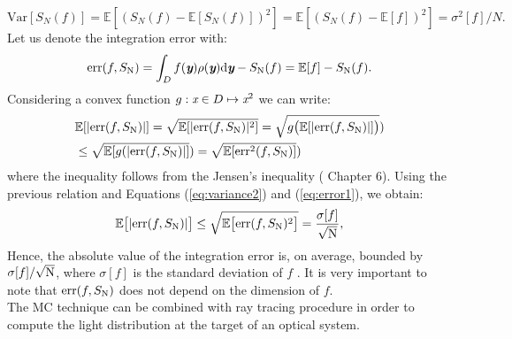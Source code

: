 \begin{equation}\label{eq:variance2}
\textrm{Var}[S_N(f)] = \mathbb{E}[(S_{N}(f)-\mathbb{E}[S_{N}(f)])^2]= \mathbb{E}[(S_{N}(f)-\mathbb{E}[f])^2] = \sigma^2[f]/N.
\end{equation}
Let us denote the integration error with:
\begin{equation}\label{eq:error1}
\textrm{err}(f, S_{\textrm{N}}) =\int_{D}f(\textit{\textbf{y}})\rho(\textit{\textbf{y}}) \textrm{d}\textit{\textbf{y}}-S_{\textrm{N}}(f) = \mathbb{E}[f]-S_{\textrm{N}}(f).
\end{equation}
Considering a convex function $g:\textit{x}\in D\mapsto\textit{x}^2$ we can write:
\begin{equation}
\begin{aligned}
&\mathbb{E}[|\textrm{err}(f, S_{\textrm{N}})|] = \sqrt{\mathbb{E}[|\textrm{err}(f, S_{\textrm{N}})|^2]} = \sqrt{g\big(\mathbb{E}[|\textrm{err}(f, S_{\textrm{N}})|]\big)}) \\&\leq\sqrt{\mathbb{E}[g(|\textrm{err}(f, S_{\textrm{N}})|]}) = \sqrt{\mathbb{E}[\textrm{err}^2(f, S_{\textrm{N}})]})
\end{aligned}
\end{equation} 
where the inequality follows from the Jensen's inequality (\cite{williams1991probability} Chapter $6$).
Using the previous relation and Equations (\ref{eq:variance2}) and (\ref{eq:error1}), we obtain:
\begin{equation}\label{eq:mean_error}
\mathbb{E}\big[|\textrm{err}(f, S_{\textrm{N}})|\big]\leq
\sqrt{\mathbb{E}\big[\textrm{err}(f, S_{\textrm{N}})^2\big]} = \frac{\sigma[f]}{\sqrt{\textrm{N}}},
\end{equation}
Hence, the absolute value of the integration error is, on average, bounded by $\sigma[f]/\sqrt{\textrm{N}}$, where $\sigma[f]$ is the standard deviation of $f$ \cite{leobacher2014introduction}. It is very important to note that $\textrm{err}(f, S_{\textrm{N}})$ does not depend on the dimension of $f$.
\\ \indent The MC technique can be combined with ray tracing procedure in order to compute the light distribution at the target of an optical system.
